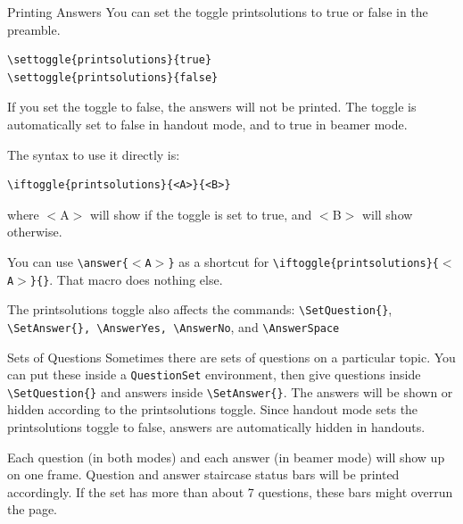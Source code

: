 \documentclass[10pt]{beamer}
\begin{document}
\begin{frame}[fragile]{Printing Answers}
You can set the toggle printsolutions to true or false in the preamble. \vfill
\begin{verbatim}
\settoggle{printsolutions}{true}
\settoggle{printsolutions}{false}
\end{verbatim}\vfill

If you set the toggle to false, the answers will not be printed.  The toggle is automatically set to false in handout mode, and to true in beamer mode.\vfill

The syntax to use it directly is:\vfill
\begin{verbatim}
\iftoggle{printsolutions}{<A>}{<B>}
\end{verbatim}\vfill
where $<$A$>$ will show if the toggle is set to true, and $<$B$>$ will show otherwise.
\end{frame}
\begin{frame}
You can use \texttt{\textbackslash answer\{$<$A$>$\}} as a shortcut for \texttt{\textbackslash iftoggle\{printsolutions\}\{$<$A$>$\}\{\}}. That macro does nothing else.\vfill


The printsolutions toggle also affects the commands: \texttt{\textbackslash SetQuestion\{\}}, \texttt{\textbackslash SetAnswer\{\}, \textbackslash AnswerYes,  \textbackslash AnswerNo}, and \texttt{\textbackslash AnswerSpace} \vfill

\end{frame}
\begin{frame}{Sets of Questions}
Sometimes there are sets of questions on a particular topic. You can put these inside a \texttt{QuestionSet} environment,  then give questions inside \texttt{\textbackslash SetQuestion\{\}} and  answers inside \texttt{\textbackslash SetAnswer\{\}}. The answers will be shown or hidden according to the printsolutions toggle. Since handout mode sets the printsolutions toggle to false, answers are automatically hidden in handouts.
\vfill

Each question (in both modes) and each answer (in beamer mode) will show up on one frame. Question and answer staircase status bars will be printed accordingly. If the set has more than about 7 questions, these bars might overrun the page.
\end{frame}
\end{document}
